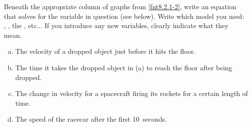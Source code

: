 \label{fnt8.2.1-3}

Beneath the appropriate column of graphs from \ref{fnt8.2.1-2}, write an equation that solves for the variable in question (see below).  Write which model you used: \FModel{}, \EnergyInteractionModel{}, the \pConsModel{}, %
etc... If you introduce any new variables, clearly indicate what they mean.

\begin{enumerate}[(a)]
	\item The velocity of a dropped object just before it hits the floor. 
	\item The time it takes the dropped object in (a) to reach the floor after being dropped.
	\item The change in velocity for a spacecraft firing its rockets for a certain length of time.
	\item The speed of the racecar after the first 10~seconds.
\end{enumerate}
